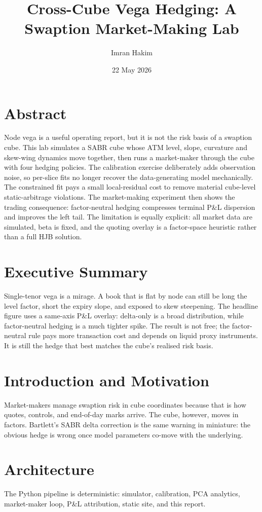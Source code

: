 \documentclass[11pt]{article}
\title{Cross-Cube Vega Hedging: A Swaption Market-Making Lab}
\author{Imran Hakim}
\date{22 May 2026}
\begin{document}
\cxcover
\section*{Abstract}
Node vega is a useful operating report, but it is not the risk basis of a
swaption cube.  This lab simulates a SABR cube whose ATM level, slope, curvature
and skew-wing dynamics move together, then runs a market-maker through the cube
with four hedging policies.  The calibration exercise deliberately adds
observation noise, so per-slice fits no longer recover the data-generating model
mechanically.  The constrained fit pays a small local-residual cost to remove
material cube-level static-arbitrage violations.  The market-making experiment
then shows the trading consequence: factor-neutral hedging compresses terminal
P\&L dispersion and improves the left tail.  The limitation is equally explicit:
all market data are simulated, beta is fixed, and the quoting overlay is a
factor-space heuristic rather than a full HJB solution.

\section*{Executive Summary}
Single-tenor vega is a mirage.  A book that is flat by node can still be long
the level factor, short the expiry slope, and exposed to skew steepening.  The
headline figure uses a same-axis P\&L overlay: delta-only is a broad distribution,
while factor-neutral hedging is a much tighter spike.  The result is not free;
the factor-neutral rule pays more transaction cost and depends on liquid proxy
instruments.  It is still the hedge that best matches the cube's realised risk
basis.

\section{Introduction and Motivation}
Market-makers manage swaption risk in cube coordinates because that is how
quotes, controls, and end-of-day marks arrive.  The cube, however, moves in
factors.  Bartlett's SABR delta correction is the same warning in miniature:
the obvious hedge is wrong once model parameters co-move with the underlying.

\section{Architecture}

The Python pipeline is deterministic: simulator, calibration, PCA analytics,
market-maker loop, P\&L attribution, static site, and this report.
\end{document}
